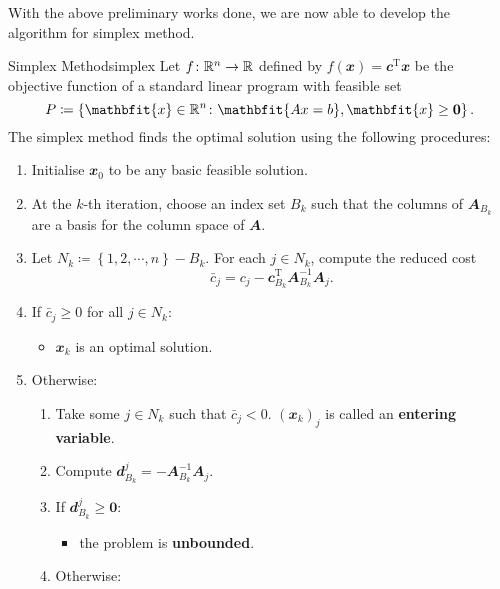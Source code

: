 \documentclass[math, code]{amznotes}
\theoremstyle{remark}
\begin{document}
With the above preliminary works done, we are now able to develop the algorithm for simplex method.
\begin{tecbox}{Simplex Method}{simplex}
    Let $f \colon \mathbb{R}^n \to \mathbb{R}$ defined by $f(\mathbfit{x}) = \mathbfit{c}^{\mathrm{T}}\mathbfit{x}$ be the objective function of a standard linear program with feasible set 
    \begin{equation*}
        P \coloneqq \left\{\mathbfit{x} \in \R^n \colon \mathbfit{Ax = b}, \mathbfit{x} \geq \mathbf{0}\right\}.
    \end{equation*}
    The simplex method finds the optimal solution using the following procedures:
    \begin{enumerate}
        \item Initialise $\mathbfit{x}_0$ to be any basic feasible solution. 
        \item At the $k$-th iteration, choose an index set $B_k$ such that the columns of $\mathbfit{A}_{B_k}$ are a basis for the column space of $\mathbfit{A}$.
        \item Let $N_k \coloneqq \left\{1, 2, \cdots, n\right\} - B_k$. For each $j \in N_k$, compute the reduced cost 
        \begin{equation*}
            \bar{c}_j = c_j - \mathbfit{c}_{B_k}^{\mathrm{T}}\mathbfit{A}_{B_k}^{-1}\mathbfit{A}_j.
        \end{equation*}
        \item If $\bar{c}_j \geq 0$ for all $j \in N_k$:
        \begin{itemize}
            \item $\mathbfit{x}_k$ is an optimal solution.
        \end{itemize}
        \item Otherwise:
        \begin{enumerate}
            \item Take some $j \in N_k$ such that $\bar{c}_j < 0$. $\left(\mathbfit{x}_{k}\right)_j$ is called an {\color{red} \textbf{entering variable}}.
            \item Compute $\mathbfit{d}^j_{B_k} = -\mathbfit{A}_{B_k}^{-1}\mathbfit{A}_j$.
            \item If $\mathbfit{d}^j_{B_k} \geq \mathbf{0}$:
            \begin{itemize}
                \item the problem is {\color{red} \textbf{unbounded}}.
            \end{itemize}
            \item Otherwise:

\end{enumerate}
\end{enumerate}
\end{tecbox}
\end{document}
